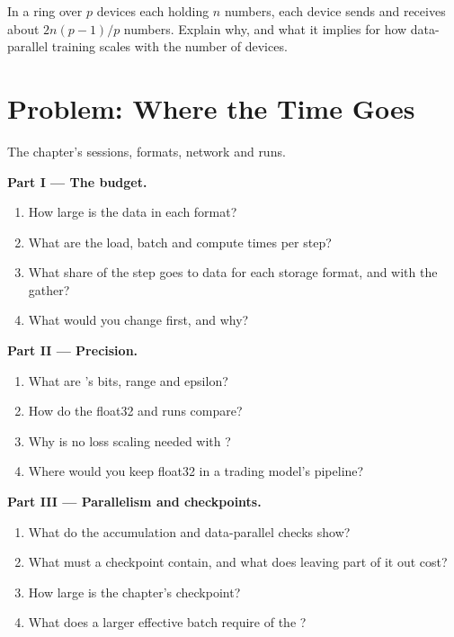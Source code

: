 \begin{exercise}[$\star\star\star$]\label{exo:ml:training-infrastructure:8}
In a ring  over $p$ devices each holding $n$ numbers, each device sends and receives about $2n(p-1)/p$ numbers. Explain
why, and what it implies for how data-parallel training scales with the number of devices.
\end{exercise}

\section{Problem: Where the Time Goes}

\begin{problem}\label{pb:ml:training-infrastructure:1}
The chapter's sessions, formats, network and runs.

\medskip\noindent\textbf{Part I --- The budget.}
\begin{enumerate}
\item How large is the data in each format?
\item What are the load, batch and compute times per step?
\item What share of the step goes to data for each storage format, and with the gather?
\item What would you change first, and why?
\end{enumerate}

\medskip\noindent\textbf{Part II --- Precision.}
\begin{enumerate}[resume]
\item What are 's bits, range and epsilon?
\item How do the float32 and  runs compare?
\item Why is no loss scaling needed with ?
\item Where would you keep float32 in a trading model's pipeline?
\end{enumerate}

\medskip\noindent\textbf{Part III --- Parallelism and checkpoints.}
\begin{enumerate}[resume]
\item What do the accumulation and data-parallel checks show?
\item What must a checkpoint contain, and what does leaving part of it out cost?
\item How large is the chapter's checkpoint?
\item What does a larger effective batch require of the ?
\end{enumerate}


\end{problem}
